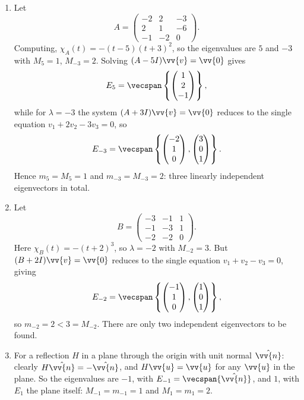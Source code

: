 \begin{example}[Multiplicities]
	\begin{enumerate}[label=(\roman*)]
		\item Let
		$$
		A = \begin{pmatrix}
			-2 & 2 & -3 \\ 2 & 1 & -6 \\ -1 & -2 & 0
		\end{pmatrix}.
		$$
		Computing, $\chi_A(t) = -(t - 5)(t+3)^2$, so the eigenvalues are $5$ and $-3$ with $M_5 = 1$, $M_{-3} = 2$. Solving $(A - 5I)\vv{v} = \vv{0}$ gives
		$$
		E_5 = \vecspan\left\{\begin{pmatrix} 1 \\ 2 \\ -1 \end{pmatrix}\right\},
		$$
		while for $\lambda = -3$ the system $(A + 3I)\vv{v} = \vv{0}$ reduces to the single equation $v_1 + 2v_2 - 3v_3 = 0$, so
		$$
		E_{-3} = \vecspan\left\{\begin{pmatrix} -2 \\ 1 \\ 0 \end{pmatrix}, \begin{pmatrix} 3 \\ 0 \\ 1\end{pmatrix}\right\}.
		$$
		Hence $m_5 = M_5 = 1$ and $m_{-3} = M_{-3} = 2$: three linearly independent eigenvectors in total.
		\item Let
		$$
		B = \begin{pmatrix}
			-3 & -1 & 1 \\ -1 & -3 & 1 \\ -2 & -2 & 0
		\end{pmatrix}.
		$$
		Here $\chi_B(t) = -(t + 2)^3$, so $\lambda = -2$ with $M_{-2} = 3$. But $(B + 2I)\vv{v} = \vv{0}$ reduces to the single equation $v_1 + v_2 - v_3 = 0$, giving
		$$
		E_{-2} = \vecspan\left\{\begin{pmatrix} -1 \\ 1 \\ 0\end{pmatrix}, \begin{pmatrix} 1 \\ 0 \\ 1 \end{pmatrix}\right\},
		$$
		so $m_{-2} = 2 < 3 = M_{-2}$. There are only two independent eigenvectors to be found.
		\item For a reflection $H$ in a plane through the origin with unit normal $\hat{\vv{n}}$: clearly $H \hat{\vv{n}} = -\hat{\vv{n}}$, and $H\vv{u} = \vv{u}$ for any $\vv{u}$ in the plane. So the eigenvalues are $-1$, with $E_{-1} = \vecspan\{\hat{\vv{n}}\}$, and $1$, with $E_1$ the plane itself: $M_{-1} = m_{-1} = 1$ and $M_1 = m_1 = 2$.

\end{enumerate}
\end{example}
